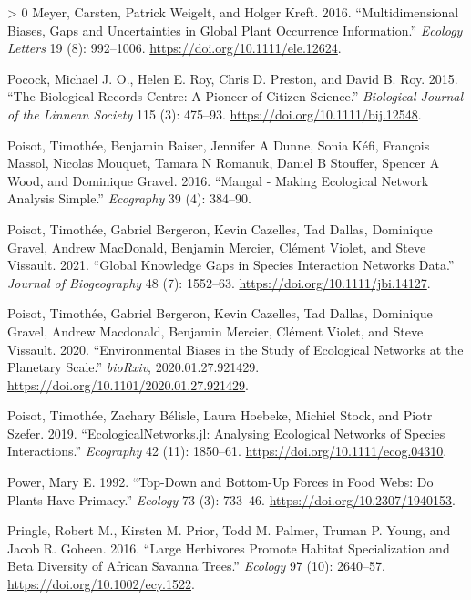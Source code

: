 \documentclass[10pt,oneside]{article}
\newlength{\cslhangindent}
\newenvironment{CSLReferences}[3] %
 {%
  \setlength{\parindent}{0pt}
  \ifodd #1 \everypar{\setlength{\hangindent}{\cslhangindent}}\ignorespaces\fi
  \ifnum #2 > 0
  \setlength{\parskip}{#2\baselineskip}
  \fi
 }%
 {}
\begin{document}
\begin{CSLReferences}{1}{0}
\leavevmode\hypertarget{ref-Meyer2016MulBia}{}%
Meyer, Carsten, Patrick Weigelt, and Holger Kreft. 2016.
{``Multidimensional Biases, Gaps and Uncertainties in Global Plant
Occurrence Information.''} \emph{Ecology Letters} 19 (8): 992--1006.
\url{https://doi.org/10.1111/ele.12624}.

\leavevmode\hypertarget{ref-Pocock2015BioRec}{}%
Pocock, Michael J. O., Helen E. Roy, Chris D. Preston, and David B. Roy.
2015. {``The Biological Records Centre: A Pioneer of Citizen Science.''}
\emph{Biological Journal of the Linnean Society} 115 (3): 475--93.
\url{https://doi.org/10.1111/bij.12548}.

\leavevmode\hypertarget{ref-Poisot2016ManMak}{}%
Poisot, Timothée, Benjamin Baiser, Jennifer A Dunne, Sonia Kéfi,
François Massol, Nicolas Mouquet, Tamara N Romanuk, Daniel B Stouffer,
Spencer A Wood, and Dominique Gravel. 2016. {``Mangal - Making
Ecological Network Analysis Simple.''} \emph{Ecography} 39 (4): 384--90.

\leavevmode\hypertarget{ref-Poisot2021GloKno}{}%
Poisot, Timothée, Gabriel Bergeron, Kevin Cazelles, Tad Dallas,
Dominique Gravel, Andrew MacDonald, Benjamin Mercier, Clément Violet,
and Steve Vissault. 2021. {``Global Knowledge Gaps in Species
Interaction Networks Data.''} \emph{Journal of Biogeography} 48 (7):
1552--63. \url{https://doi.org/10.1111/jbi.14127}.

\leavevmode\hypertarget{ref-Poisot2020EnvBia}{}%
Poisot, Timothée, Gabriel Bergeron, Kevin Cazelles, Tad Dallas,
Dominique Gravel, Andrew Macdonald, Benjamin Mercier, Clément Violet,
and Steve Vissault. 2020. {``Environmental Biases in the Study of
Ecological Networks at the Planetary Scale.''} \emph{bioRxiv},
2020.01.27.921429. \url{https://doi.org/10.1101/2020.01.27.921429}.

\leavevmode\hypertarget{ref-Poisot2019EcoJl}{}%
Poisot, Timothée, Zachary Bélisle, Laura Hoebeke, Michiel Stock, and
Piotr Szefer. 2019. {``EcologicalNetworks.jl: Analysing Ecological
Networks of Species Interactions.''} \emph{Ecography} 42 (11): 1850--61.
\url{https://doi.org/10.1111/ecog.04310}.

\leavevmode\hypertarget{ref-Power1992TopBot}{}%
Power, Mary E. 1992. {``Top-Down and Bottom-Up Forces in Food Webs: Do
Plants Have Primacy.''} \emph{Ecology} 73 (3): 733--46.
\url{https://doi.org/10.2307/1940153}.

\leavevmode\hypertarget{ref-Pringle2016LarHer}{}%
Pringle, Robert M., Kirsten M. Prior, Todd M. Palmer, Truman P. Young,
and Jacob R. Goheen. 2016. {``Large Herbivores Promote Habitat
Specialization and Beta Diversity of African Savanna Trees.''}
\emph{Ecology} 97 (10): 2640--57.
\url{https://doi.org/10.1002/ecy.1522}.


\end{CSLReferences}
\end{document}
